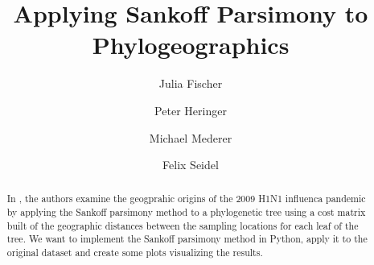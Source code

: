 \documentclass{article}
\title{Applying Sankoff Parsimony to Phylogeographics}
\author{Julia Fischer 
\and 
Peter Heringer
\and
Michael Mederer
\and
Felix Seidel}
\begin{document}
\maketitle
\begin{abstract}
In \cite{reimering2020phylogeographic}, the authors examine the geogprahic
origins of the 2009 H1N1 influenca pandemic by applying the Sankoff parsimony
method to a phylogenetic tree using a cost matrix built of the geographic
distances between the sampling locations for each leaf of the tree. 
We want to implement the Sankoff parsimony method in Python, apply it to the
original dataset \cite{reimering_distance_2019} and create some plots
visualizing the results.
\end{abstract}

\printbibliography
    
\end{document}
